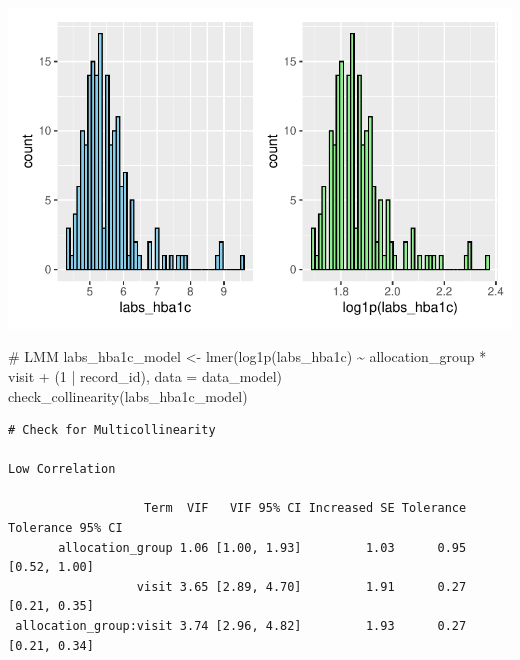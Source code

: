 \documentclass[
  12pt,
]{article}
\newenvironment{Shaded}{\begin{snugshade}}{\end{snugshade}}
\newcommand{\AttributeTok}[1]{\textcolor[rgb]{0.40,0.45,0.13}{#1}}
\newcommand{\CommentTok}[1]{\textcolor[rgb]{0.37,0.37,0.37}{#1}}
\newcommand{\DecValTok}[1]{\textcolor[rgb]{0.68,0.00,0.00}{#1}}
\newcommand{\FunctionTok}[1]{\textcolor[rgb]{0.28,0.35,0.67}{#1}}
\newcommand{\NormalTok}[1]{\textcolor[rgb]{0.00,0.23,0.31}{#1}}
\newcommand{\OtherTok}[1]{\textcolor[rgb]{0.00,0.23,0.31}{#1}}
\newcommand{\SpecialCharTok}[1]{\textcolor[rgb]{0.37,0.37,0.37}{#1}}
\begin{document}
\includegraphics{Outcomes_files/figure-pdf/labs_hba1c_1-1.pdf}

\begin{Shaded}
\begin{Highlighting}[]
\CommentTok{\# LMM}
\NormalTok{labs\_hba1c\_model }\OtherTok{\textless{}{-}} \FunctionTok{lmer}\NormalTok{(}\FunctionTok{log1p}\NormalTok{(labs\_hba1c) }\SpecialCharTok{\textasciitilde{}}\NormalTok{ allocation\_group }\SpecialCharTok{*}\NormalTok{ visit }\SpecialCharTok{+} 
\NormalTok{(}\DecValTok{1} \SpecialCharTok{|}\NormalTok{ record\_id), }\AttributeTok{data =}\NormalTok{ data\_model)}
\FunctionTok{check\_collinearity}\NormalTok{(labs\_hba1c\_model)}
\end{Highlighting}
\end{Shaded}

\begin{verbatim}
# Check for Multicollinearity

Low Correlation

                   Term  VIF   VIF 95% CI Increased SE Tolerance Tolerance 95% CI
       allocation_group 1.06 [1.00, 1.93]         1.03      0.95     [0.52, 1.00]
                  visit 3.65 [2.89, 4.70]         1.91      0.27     [0.21, 0.35]
 allocation_group:visit 3.74 [2.96, 4.82]         1.93      0.27     [0.21, 0.34]
\end{verbatim}
\end{document}
